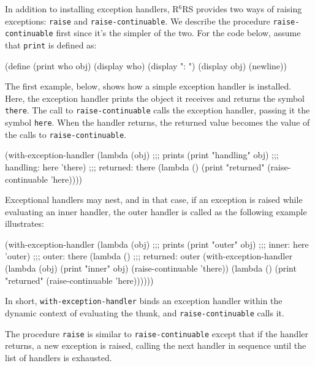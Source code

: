 \documentclass[onecolumn, 12pt, twoside, openright, dvipdfm]{book}
\newcommand{\rnrs}[1]{R$^{\mathrm{#1}}$RS}
\begin{document}
In addition to installing exception handlers, \rnrs{6} provides two
ways of raising exceptions: \texttt{raise} and
\texttt{raise-continuable}.  We describe the procedure
\texttt{raise-continuable} 
first since it's the simpler of the two.  
For the code below, assume that \texttt{print} is defined as:
\begin{CodeInline}
(define (print who obj)
  (display who) 
  (display ": ")
  (display obj)
  (newline))
\end{CodeInline}

The first example, below, shows how a simple exception handler is
installed.  Here, the exception handler prints the object it
receives and returns the symbol \texttt{there}.  The call to
\texttt{raise-continuable} calls the exception handler, passing it
the symbol \texttt{here}.  When the handler returns, the returned
value becomes the value of the calls to \texttt{raise-continuable}.

\begin{CodeInline}
(with-exception-handler
  (lambda (obj)                         ;;; prints
    (print "handling" obj)              ;;;   handling: here
    'there)                             ;;;   returned: there
  (lambda ()
    (print "returned" (raise-continuable 'here))))
\end{CodeInline}

Exceptional handlers may nest, and in that case, if an exception is
raised while evaluating an inner handler, the outer handler is
called as the following example illustrates:

\begin{CodeInline}
(with-exception-handler
  (lambda (obj)                         ;;; prints
    (print "outer" obj)                 ;;;   inner: here    
    'outer)                             ;;;   outer: there   
  (lambda ()                            ;;;   returned: outer
    (with-exception-handler
      (lambda (obj)
        (print "inner" obj)
        (raise-continuable 'there))
      (lambda ()
        (print "returned" (raise-continuable 'here))))))
\end{CodeInline}

In short, \texttt{with-exception-handler} binds an exception handler
within the dynamic context of evaluating the thunk, and
\texttt{raise-continuable} calls it.

The procedure \texttt{raise} is similar to
\texttt{raise-continuable} except that if the handler returns, a new
exception is raised, calling the next handler in sequence until the
list of handlers is exhausted.
\end{document}
